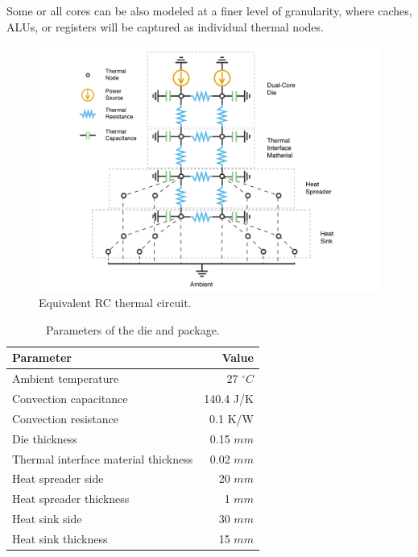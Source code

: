 Some or all cores can be also modeled at a finer level of granularity, where caches, ALUs, or registers will be captured as individual thermal nodes.
\begin{figure}
  \centering
  \includegraphics[width=\linewidth]{assets/circuit.pdf}
  \vspace{-15pt}
  \caption{Equivalent RC thermal circuit.}
  \label{fig:circuit}
  \vspace{15pt}
\end{figure}
\begin{table}[b]
  \vspace{15pt}
  \caption{Parameters of the die and package.}
  \label{tab:parameters}
  \centering
  \begin{tabular}{|l|r|}
    \hline
    Parameter & Value \\
    \hline
    \hline
    Ambient temperature                   &   27 ${}^\circ C$ \\
    Convection capacitance                & 140.4 J/K \\
    Convection resistance                 & 0.1 K/W \\
    Die thickness                         & 0.15 $mm$ \\
    Thermal interface material thickness  & 0.02 $mm$ \\
    Heat spreader side                    &   20 $mm$ \\
    Heat spreader thickness               &    1 $mm$ \\
    Heat sink side                        &   30 $mm$ \\
    Heat sink thickness                   &   15 $mm$ \\
    \hline
  \end{tabular}
\end{table}
